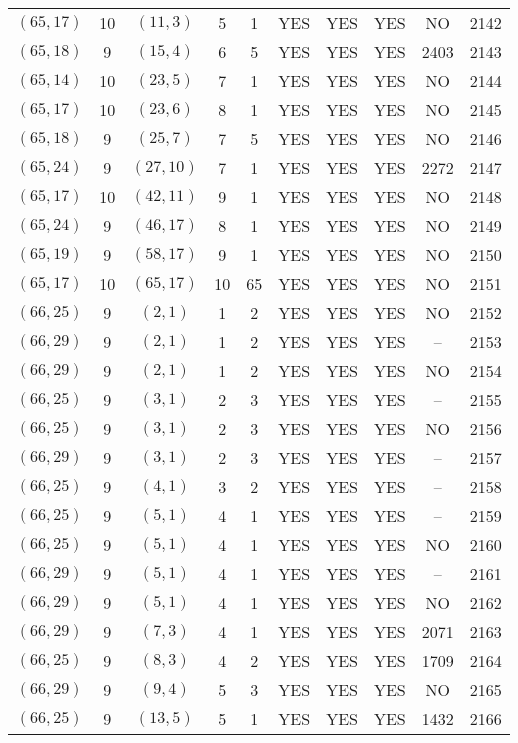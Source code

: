 \begin{longtable}{|c|c|c|c|c|c|c|c|c|c|}
$(65, 17)$ & 10 & $(11, 3)$ & 5 & 1 & YES & YES & YES & NO & 2142\\
$(65, 18)$ & 9 & $(15, 4)$ & 6 & 5 & YES & YES & YES & 2403 & 2143\\
$(65, 14)$ & 10 & $(23, 5)$ & 7 & 1 & YES & YES & YES & NO & 2144\\
$(65, 17)$ & 10 & $(23, 6)$ & 8 & 1 & YES & YES & YES & NO & 2145\\
$(65, 18)$ & 9 & $(25, 7)$ & 7 & 5 & YES & YES & YES & NO & 2146\\
$(65, 24)$ & 9 & $(27, 10)$ & 7 & 1 & YES & YES & YES & 2272 & 2147\\
$(65, 17)$ & 10 & $(42, 11)$ & 9 & 1 & YES & YES & YES & NO & 2148\\
$(65, 24)$ & 9 & $(46, 17)$ & 8 & 1 & YES & YES & YES & NO & 2149\\
$(65, 19)$ & 9 & $(58, 17)$ & 9 & 1 & YES & YES & YES & NO & 2150\\
$(65, 17)$ & 10 & $(65, 17)$ & 10 & 65 & YES & YES & YES & NO & 2151\\
$(66, 25)$ & 9 & $(2, 1)$ & 1 & 2 & YES & YES & YES & NO & 2152\\
$(66, 29)$ & 9 & $(2, 1)$ & 1 & 2 & YES & YES & YES & -- & 2153\\
$(66, 29)$ & 9 & $(2, 1)$ & 1 & 2 & YES & YES & YES & NO & 2154\\
$(66, 25)$ & 9 & $(3, 1)$ & 2 & 3 & YES & YES & YES & -- & 2155\\
$(66, 25)$ & 9 & $(3, 1)$ & 2 & 3 & YES & YES & YES & NO & 2156\\
$(66, 29)$ & 9 & $(3, 1)$ & 2 & 3 & YES & YES & YES & -- & 2157\\
$(66, 25)$ & 9 & $(4, 1)$ & 3 & 2 & YES & YES & YES & -- & 2158\\
$(66, 25)$ & 9 & $(5, 1)$ & 4 & 1 & YES & YES & YES & -- & 2159\\
$(66, 25)$ & 9 & $(5, 1)$ & 4 & 1 & YES & YES & YES & NO & 2160\\
$(66, 29)$ & 9 & $(5, 1)$ & 4 & 1 & YES & YES & YES & -- & 2161\\
$(66, 29)$ & 9 & $(5, 1)$ & 4 & 1 & YES & YES & YES & NO & 2162\\
$(66, 29)$ & 9 & $(7, 3)$ & 4 & 1 & YES & YES & YES & 2071 & 2163\\
$(66, 25)$ & 9 & $(8, 3)$ & 4 & 2 & YES & YES & YES & 1709 & 2164\\
$(66, 29)$ & 9 & $(9, 4)$ & 5 & 3 & YES & YES & YES & NO & 2165\\
$(66, 25)$ & 9 & $(13, 5)$ & 5 & 1 & YES & YES & YES & 1432 & 2166\\

\end{longtable}
